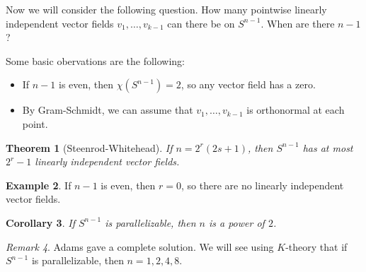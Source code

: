 \documentclass[leqno, openany]{memoir}
\newtheorem{thm}{Theorem}[section]
\newtheorem{cor}[thm]{Corollary}
\theoremstyle{definition}
\newtheorem{exm}[thm]{Example}
\theoremstyle{remark}
\newtheorem{rmk}[thm]{Remark}
\theoremstyle{plain}
\theoremstyle{definition}
\theoremstyle{remark}
\begin{document}
Now we will consider the following question. How many pointwise linearly independent vector fields $v_1, \ldots, v_{k-1}$ can there be on $S^{n-1}$. When are there $n-1$?

Some basic obervations are the following:
\begin{itemize}
    \item If $n-1$ is even, then $\chi(S^{n-1}) = 2$, so any vector field has a zero.
    \item By Gram-Schmidt, we can assume that $v_1, \ldots, v_{k-1}$ is orthonormal at each point.
\end{itemize}

\begin{thm}[Steenrod-Whitehead]
    If $n = 2^r (2s+1)$, then $S^{n-1}$ has at most $2^{r}-1$ linearly independent vector fields.
\end{thm}

\begin{exm}
    If $n-1$ is even, then $r=0$, so there are no linearly independent vector fields.
\end{exm}

\begin{cor}
    If $S^{n-1}$ is parallelizable, then $n$ is a power of $2$.
\end{cor}

\begin{rmk}
    Adams gave a complete solution. We will see using $K$-theory that if $S^{n-1}$ is parallelizable, then $n = 1,2,4,8$.
\end{rmk}
\end{document}
